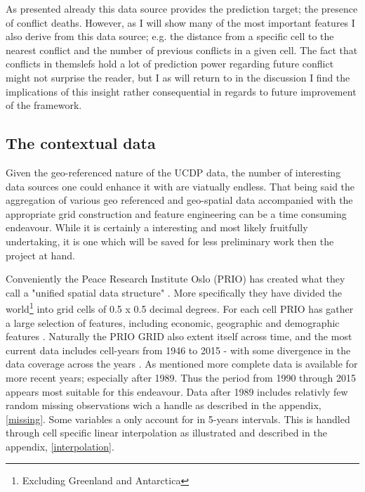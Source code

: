 \documentclass[a4paper]{article}
\begin{document}
As presented already this data source provides the prediction target; the presence of conflict deaths. However, as I will show many of the most important features I also derive from this data source; e.g. the distance from a specific cell to the nearest conflict and the number of previous conflicts in a given cell. The fact that conflicts in themslefs hold a lot of prediction power regarding future conflict might not surprise the reader, but I as will return to in the discussion I find the implications of this insight rather consequential in regards to future improvement of the framework.\par


\subsection{The contextual data}

Given the geo-referenced nature of the UCDP data, the number of interesting data sources one could enhance it with are viatually endless. That being said the aggregation of various geo referenced and geo-spatial data accompanied with the appropriate grid construction and feature engineering can be a time consuming endeavour. While it is certainly a interesting and most likely fruitfully undertaking, it is one which will be saved for less preliminary work then the project at hand.\par

Conveniently the Peace Research Institute Oslo (PRIO) has created what they call a "unified spatial data structure" \cite[1]{Tollefsen_2012}. More specifically they have divided the world\footnote{Excluding Greenland and Antarctica} into grid cells of 0.5 x 0.5 decimal degrees. For each cell PRIO has gather a large selection of features, including economic, geographic and demographic features \citep{Tollefsen_2012}. Naturally the PRIO GRID also extent itself across time, and the most current data includes cell-years from 1946 to 2015 - with some divergence in the data coverage across the years \citep{Tollefsen_2016}. As mentioned more complete data is available for more recent years; especially after 1989. Thus the period from 1990 through 2015 appears most suitable for this endeavour. Data after 1989 includes relativly few random missing observations wich a handle as described in the appendix, \autoref{missing}. Some variables a only account for in 5-years intervals. This is handled through cell specific linear interpolation as illustrated and described in the appendix, \autoref{interpolation}.\par
\end{document}
